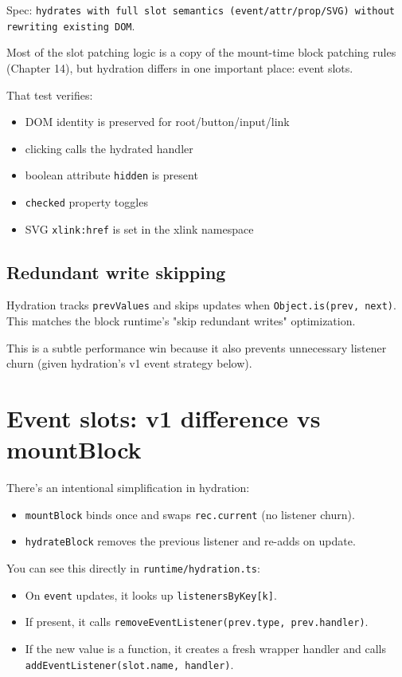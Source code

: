 Spec: \texttt{hydrates with full slot semantics (event/attr/prop/SVG) without rewriting existing DOM}.

Most of the slot patching logic is a copy of the mount-time block patching rules (Chapter 14), but hydration differs in one important place: event slots.

That test verifies:

\begin{itemize}
  \item DOM identity is preserved for root/button/input/link
  \item clicking calls the hydrated handler
  \item boolean attribute \texttt{hidden} is present
  \item \texttt{checked} property toggles
  \item SVG \texttt{xlink:href} is set in the xlink namespace
\end{itemize}

\subsection{Redundant write skipping}

Hydration tracks \texttt{prevValues} and skips updates when \texttt{Object.is(prev, next)}.
This matches the block runtime’s "skip redundant writes" optimization.

This is a subtle performance win because it also prevents unnecessary listener churn (given hydration’s v1 event strategy below).

\section{Event slots: v1 difference vs mountBlock}

There’s an intentional simplification in hydration:

\begin{itemize}
  \item \texttt{mountBlock} binds once and swaps \texttt{rec.current} (no listener churn).
  \item \texttt{hydrateBlock} removes the previous listener and re-adds on update.
\end{itemize}

You can see this directly in \texttt{runtime/hydration.ts}:

\begin{itemize}
  \item On \texttt{event} updates, it looks up \texttt{listenersByKey[k]}.
  \item If present, it calls \texttt{removeEventListener(prev.type, prev.handler)}.
  \item If the new value is a function, it creates a fresh wrapper handler and calls \texttt{addEventListener(slot.name, handler)}.
\end{itemize}

